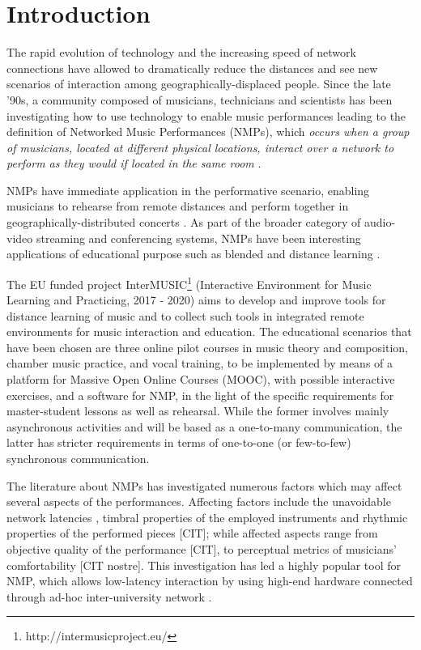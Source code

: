 
\section{Introduction}\label{sec:introduction}

The rapid evolution of technology and the increasing speed of network connections have allowed to dramatically reduce the distances and see new scenarios of interaction among geogra\-phically-displaced people. Since the late '90s, a community composed of musicians, technicians and  scientists has been investigating how to use technology to enable music performances leading to the definition of Networked Music Performances (NMPs), which \textit{occurs when a group of musicians, located at different physical locations, interact over a network to perform as they would if located in the same room} \cite{Lazzaro2001}.

NMPs have immediate application in the performative scenario, enabling musicians to rehearse from remote distances and perform together in geographically-distributed concerts \cite{barbosa2003displaced}. As part of the broader category of audio-video streaming and conferencing systems, NMPs have been interesting applications of educational purpose such as blended and distance learning \cite{IorwerthNMP2015}.    


The EU funded project InterMUSIC\footnote{http://intermusicproject.eu/} (Interactive Environment for Music Learning and Practicing, 2017 - 2020) aims to develop and improve tools for distance learning of music and to collect such tools in integrated remote environments for music interaction and education. The educational scenarios that have been chosen are three online pilot courses in music theory and composition, chamber music practice, and vocal training, to be implemented by means of a platform for Massive Open Online Courses (MOOC), with possible interactive exercises, and a software for NMP, in the light of the specific requirements for master-student lessons as well as rehearsal. While the former involves mainly asynchronous activities and will be based as a one-to-many communication, the latter has stricter requirements in terms of one-to-one (or few-to-few) synchronous communication. 

The literature about NMPs has investigated numerous factors which may affect several aspects of the performances. Affecting factors include the unavoidable network latencies \cite{RottondiFeature}, timbral properties of the employed instruments \cite{Kolazi2013} and rhythmic properties of the performed pieces [CIT]; while affected aspects range from objective quality of the performance [CIT], to perceptual metrics of musicians' comfortability [CIT nostre]. This investigation has led a highly popular tool for NMP, which allows low-latency interaction by using high-end hardware connected through ad-hoc inter-university network \cite{drioli2013networked}. 

